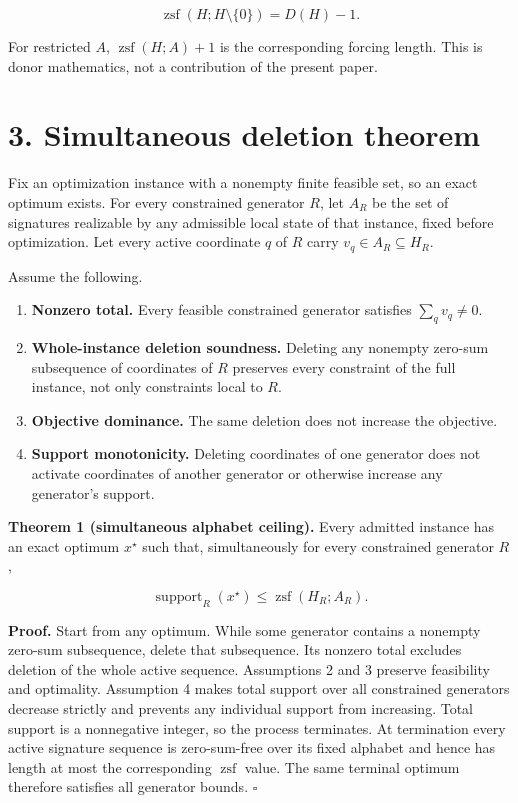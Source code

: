 \documentclass[11pt]{article}
\providecommand{\tightlist}{\setlength{\itemsep}{0pt}\setlength{\parskip}{0pt}}
\begin{document}
\[
\operatorname{zsf}(H;H\setminus\{0\})=D(H)-1.
\]

For restricted \(A\), \(\operatorname{zsf}(H;A)+1\) is the corresponding forcing length. This is donor mathematics, not a contribution of the present paper.

\hypertarget{simultaneous-deletion-theorem}{%
\section*{3. Simultaneous deletion theorem}\label{simultaneous-deletion-theorem}}

Fix an optimization instance with a nonempty finite feasible set, so an exact optimum exists. For every constrained generator \(R\), let \(A_R\) be the set of signatures realizable by any admissible local state of that instance, fixed before optimization. Let every active coordinate \(q\) of \(R\) carry \(v_q\in A_R\subseteq H_R\).

Assume the following.

\begin{enumerate}
\def\labelenumi{\arabic{enumi}.}
\tightlist
\item
  \textbf{Nonzero total.} Every feasible constrained generator satisfies \(\sum_q v_q\neq 0\).
\item
  \textbf{Whole-instance deletion soundness.} Deleting any nonempty zero-sum subsequence of coordinates of \(R\) preserves every constraint of the full instance, not only constraints local to \(R\).
\item
  \textbf{Objective dominance.} The same deletion does not increase the objective.
\item
  \textbf{Support monotonicity.} Deleting coordinates of one generator does not activate coordinates of another generator or otherwise increase any generator's support.
\end{enumerate}

\textbf{Theorem 1 (simultaneous alphabet ceiling).} Every admitted instance has an exact optimum \(x^\star\) such that, simultaneously for every constrained generator \(R\),

\[
\operatorname{support}_R(x^\star)
\leq
\operatorname{zsf}(H_R;A_R).
\]

\textbf{Proof.} Start from any optimum. While some generator contains a nonempty zero-sum subsequence, delete that subsequence. Its nonzero total excludes deletion of the whole active sequence. Assumptions 2 and 3 preserve feasibility and optimality. Assumption 4 makes total support over all constrained generators decrease strictly and prevents any individual support from increasing. Total support is a nonnegative integer, so the process terminates. At termination every active signature sequence is zero-sum-free over its fixed alphabet and hence has length at most the corresponding \(\operatorname{zsf}\) value. The same terminal optimum therefore satisfies all generator bounds. \(\square\)
\end{document}
